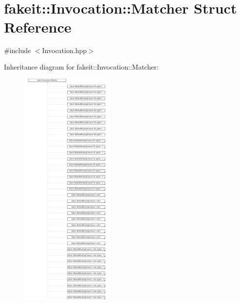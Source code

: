 \hypertarget{structfakeit_1_1Invocation_1_1Matcher}{}\section{fakeit\+::Invocation\+::Matcher Struct Reference}
\label{structfakeit_1_1Invocation_1_1Matcher}


{\ttfamily \#include $<$Invocation.\+hpp$>$}

Inheritance diagram for fakeit\+::Invocation\+::Matcher\+:\begin{figure}[H]
\begin{center}
\leavevmode
\includegraphics[height=12.000000cm]{structfakeit_1_1Invocation_1_1Matcher}
\end{center}
\end{figure}
